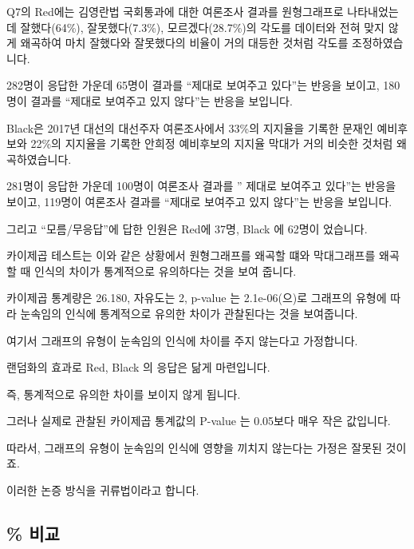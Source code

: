\documentclass[
]{book}
\begin{document}
Q7의 Red에는 김영란법 국회통과에 대한 여론조사 결과를 원형그래프로 나타내었는데 잘했다(64\%), 잘못했다(7.3\%), 모르겠다(28.7\%)의 각도를 데이터와 전혀 맞지 않게 왜곡하여 마치 잘했다와 잘못했다의 비율이 거의 대등한 것처럼 각도를 조정하였습니다.

282명이 응답한 가운데 65명이 결과를 ``제대로 보여주고 있다''는 반응을 보이고, 180명이 결과를 ``제대로 보여주고 있지 않다''는 반응을 보입니다.

Black은 2017년 대선의 대선주자 여론조사에서 33\%의 지지율을 기록한 문재인 예비후보와 22\%의 지지율을 기록한 안희정 예비후보의 지지율 막대가 거의 비슷한 것처럼 왜곡하였습니다.

281명이 응답한 가운데 100명이 여론조사 결과를 ''
제대로 보여주고 있다''는 반응을 보이고, 119명이 여론조사 결과를 ``제대로 보여주고 있지 않다''는 반응을 보입니다.

그리고 ``모름/무응답''에 답한 인원은 Red에 37명, Black 에 62명이 었습니다.

카이제곱 테스트는 이와 같은 상황에서 원형그래프를 왜곡할 떄와 막대그래프를 왜곡할 때 인식의 차이가 통계적으로 유의하다는 것을 보여 줍니다.

카이제곱 통계량은 26.180, 자유도는 2, p-value 는 2.1e-06(으)로
그래프의 유형에 따라 눈속임의 인식에 통계적으로 유의한 차이가 관찰된다는 것을 보여줍니다.

여기서 그래프의 유형이 눈속임의 인식에 차이를 주지 않는다고 가정합니다.

랜덤화의 효과로 Red, Black 의 응답은 닮게 마련입니다.

즉, 통계적으로 유의한 차이를 보이지 않게 됩니다.

그러나 실제로 관찰된 카이제곱 통계값의 P-value 는 0.05보다 매우 작은 값입니다.

따라서, 그래프의 유형이 눈속임의 인식에 영향을 끼치지 않는다는 가정은 잘못된 것이죠.

이러한 논증 방식을 귀류법이라고 합니다.

\subsection{\% 비교}\label{uxbe44uxad50}
\end{document}
